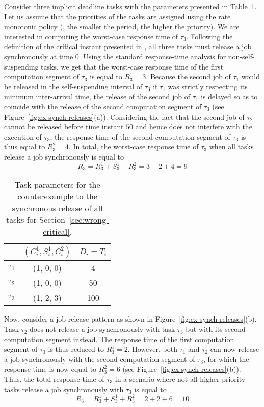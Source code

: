 Consider three implicit deadline tasks with the parameters presented in Table~\ref{table:ex-synch-releases}. Let us assume that the priorities of the tasks are assigned using the rate monotonic policy (\ie, the smaller the period, the higher the priority). We are interested in computing the worst-case response time of $\tau_3$. Following the definition of the critical instant presented in \cite{LR:rtas10}, all three tasks must release a job synchronously at time $0$. Using the standard response-time analysis for non-self-suspending tasks, we get that the worst-case response time of the first computation segment of $\tau_3$ is equal to $R_3^1 = 3$. Because the second job of $\tau_1$ would be released in the self-suspending interval of $\tau_3$ if $\tau_1$ was strictly respecting its minimum inter-arrival time, the release of the second job of $\tau_1$ is delayed so as to coincide with the release of the second computation segment of $\tau_3$ (see Figure~\ref{fig:ex-synch-releases}(a)). Considering the fact that the second job of $\tau_2$ cannot be released before time instant $50$ and hence does not interfere with the execution of $\tau_3$, the response time of the second computation segment of $\tau_3$ is thus equal to $R_3^2=4$. In total, the worst-case response time of $\tau_3$ when all tasks release a job synchronously is equal to 
$$R_3 = R_3^1 + S_3^1 + R_3^2 = 3 + 2 +4 = 9$$

\begin{table}[t] 
\centering
    \begin{tabular}{|c|c|c|}
 \hline
        & $(C_i^1, S_i^1, C_i^2)$ &  $D_i=T_i$\\ 
        \hline
        $\tau_1$ & (1, 0, 0) &  4\\ 
        $\tau_2$ &  (1, 0, 0) & 50  \\ 
        $\tau_3$ & (1, 2, 3) & 100  \\
        \hline
    \end{tabular} 
    \caption{Task parameters for the counterexample to the synchronous release of all tasks for Section~\ref{sec:wrong-critical}.}
    \label{table:ex-synch-releases}
\end{table}

Now, consider a job release pattern as shown in Figure~\ref{fig:ex-synch-releases}(b). Task $\tau_2$ does not release a job synchronously with task $\tau_3$ but with its second computation segment instead. The response time of the first computation segment of $\tau_3$ is thus reduced to $R_3^1=2$. However, both $\tau_1$ and $\tau_2$ can now release a job synchronously with the second computation segment of $\tau_3$, for which the response time is now equal to $R_3^2=6$ (see Figure~\ref{fig:ex-synch-releases}(b)). Thus, the total response time of $\tau_3$ in a scenario where not all higher-priority tasks release a job synchronously with $\tau_3$ is equal to 
$$R_3 = R_3^1 + S_3^1 + R_3^2 = 2+2+6 = 10$$


